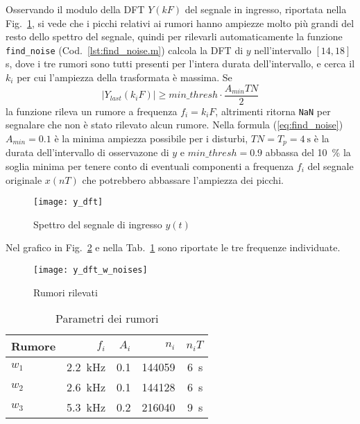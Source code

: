 \documentclass{article}
\newcommand{\fig}[1]{Fig.~\ref{#1}}
\newcommand{\cod}[1]{Cod.~\ref{#1}}
\newcommand{\tab}[1]{Tab.~\ref{#1}}
\newcommand{\eqn}[1]{(\ref{#1})}
\newcommand{\inlcd}[1]{\lstinline[basicstyle=\ttfamily,keywordstyle={}]{#1}}
\begin{document}
Osservando il modulo della DFT $Y(kF)$ del segnale in ingresso,
riportata nella \fig{plot:y_dft}, si vede che i picchi relativi ai
rumori hanno ampiezze molto più grandi del resto dello spettro del
segnale, quindi per rilevarli automaticamente la funzione
\inlcd{find_noise} (\cod{lst:find_noise.m}) calcola la DFT di $y$
nell'intervallo $[14, 18]$ s, dove i tre rumori sono tutti presenti
per l'intera durata dell'intervallo, e cerca il $k_i$ per cui
l'ampiezza della trasformata è massima. Se
\begin{equation}
  |Y_{\mathit{last}}(k_iF)| \geq \mathit{min\_thresh} \cdot \frac{A_\mathit{min}TN}{2}
  \label{eq:find_noise}
\end{equation}
la funzione rileva un rumore a frequenza $f_i = k_iF$, altrimenti
ritorna \inlcd{NaN} per segnalare che non è stato rilevato alcun
rumore. Nella formula \eqn{eq:find_noise} $A_\mathit{min} = 0.1$ è la
minima ampiezza possibile per i disturbi, $TN = T_p = \SI{4}{\s}$ è la
durata dell'intervallo di osservazone di $y$ e $\mathit{min\_thresh} =
0.9$ abbassa del \SI{10}{\percent} la soglia minima per tenere conto
di eventuali componenti a frequenza $f_i$ del segnale originale
$x(nT)$ che potrebbero abbassare l'ampiezza dei picchi.

\begin{figure}[h]
  \centering
  \texttt{[image: y\_dft]}
  \caption{Spettro del segnale di ingresso $y(t)$}
  \label{plot:y_dft}
\end{figure}

Nel grafico in \fig{plot:y_dft_w_noises} e nella
\tab{tab:noise_params} sono riportate le tre frequenze individuate.

\begin{figure}[h]
  \centering
  \texttt{[image: y\_dft\_w\_noises]}
  \caption{Rumori rilevati}
  \label{plot:y_dft_w_noises}
\end{figure}

\begin{table}[h]
  \centering
  \begin{tabular}{lrrrr}
    Rumore & $f_i$                 & $A_i$ & $n_i$ & $n_iT$    \\
    \hline
    $w_1$ & \SI{2.2}{\kilo\hertz} & 0.1 & 144059 & \SI{6}{\s} \\
    $w_2$ & \SI{2.6}{\kilo\hertz} & 0.1 & 144128 & \SI{6}{\s} \\
    $w_3$ & \SI{5.3}{\kilo\hertz} & 0.2 & 216040 & \SI{9}{\s} \\
  \end{tabular}
  \caption{Parametri dei rumori}
  \label{tab:noise_params}
\end{table}
\end{document}

